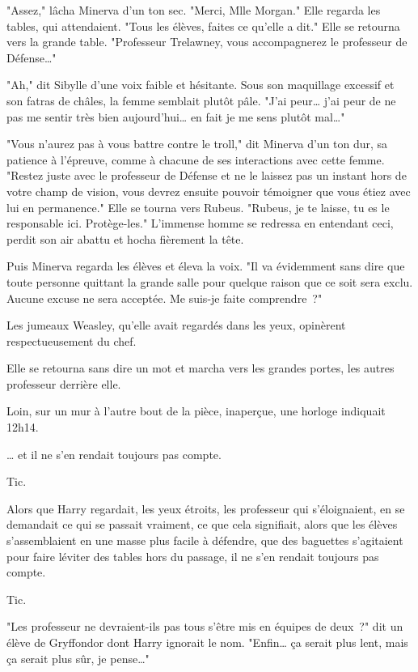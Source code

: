"Assez," lâcha Minerva d'un ton sec. "Merci, Mlle Morgan." Elle regarda les tables, qui attendaient. "Tous les élèves, faites ce qu'elle a dit." Elle se retourna vers la grande table. "Professeur Trelawney, vous accompagnerez le professeur de Défense…"

"Ah," dit Sibylle d'une voix faible et hésitante. Sous son maquillage excessif et son fatras de châles, la femme semblait plutôt pâle. "J'ai peur… j'ai peur de ne pas me sentir très bien aujourd'hui… en fait je me sens plutôt mal…"

"Vous n'aurez pas à vous battre contre le troll," dit Minerva d'un ton dur, sa patience à l'épreuve, comme à chacune de ses interactions avec cette femme. "Restez juste avec le professeur de Défense et ne le laissez pas un instant hors de votre champ de vision, vous devrez ensuite pouvoir témoigner que vous étiez avec lui en permanence." Elle se tourna vers Rubeus. "Rubeus, je te laisse, tu es le responsable ici. Protège-les." L'immense homme se redressa en entendant ceci, perdit son air abattu et hocha fièrement la tête.

Puis Minerva regarda les élèves et éleva la voix. "Il va évidemment sans dire que toute personne quittant la grande salle pour quelque raison que ce soit sera exclu. Aucune excuse ne sera acceptée. Me suis-je faite comprendre~?"

Les jumeaux Weasley, qu'elle avait regardés dans les yeux, opinèrent respectueusement du chef.

Elle se retourna sans dire un mot et marcha vers les grandes portes, les autres professeur derrière elle.

Loin, sur un mur à l'autre bout de la pièce, inaperçue, une horloge indiquait 12h14.

… et il ne s'en rendait toujours pas compte.

Tic.

Alors que Harry regardait, les yeux étroits, les professeur qui s'éloignaient, en se demandait ce qui se passait vraiment, ce que cela signifiait, alors que les élèves s'assemblaient en une masse plus facile à défendre, que des baguettes s'agitaient pour faire léviter des tables hors du passage, il ne s'en rendait toujours pas compte.

Tic.

"Les professeur ne devraient-ils pas tous s'être mis en équipes de deux~?" dit un élève de Gryffondor dont Harry ignorait le nom. "Enfin… ça serait plus lent, mais ça serait plus sûr, je pense…"

